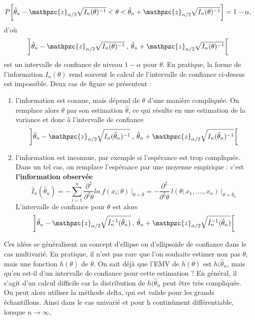 \documentclass[french]{report}
\begin{document}
\begin{equation*}
    P \bigg [\hat{\theta}_n - \mathpzc{z}_{\alpha/2}\sqrt{I_n(\theta)^{-1}} < \theta < \hat{\theta}_n + \mathpzc{z}_{\alpha/2}\sqrt{I_n(\theta)^{-1}}\bigg] = 1- \alpha,
\end{equation*}
d'où
\begin{equation*}
    \bigg ]\hat{\theta}_n - \mathpzc{z}_{\alpha/2}\sqrt{I_n(\theta)^{-1}}\:,\: \hat{\theta}_n + \mathpzc{z}_{\alpha/2}\sqrt{I_n(\theta)^{-1}}\bigg[ 
\end{equation*}
est un intervalle de confiance de niveau $1 - \alpha$ pour $\theta$.
\vskip 0.1in
En pratique, la forme de l'information $I_n(\theta)$ rend souvent le calcul de l'intervalle de confiance ci-dessus est impossible. Deux cas de figure se présentent :
\begin{enumerate}
    \item l'information est connue, mais dépend de $\theta$ d’une manière compliquée. On remplace alors $\theta$ par son estimation $\hat{\theta}$, ce qui résulte en une estimation de la variance et donc à l’intervalle de confiance
    \begin{equation*}
        \bigg ]\hat{\theta}_n - \mathpzc{z}_{\alpha/2}\sqrt{I_n(\hat{\theta}_n)^{-1}} \:,\: \hat{\theta}_n + \mathpzc{z}_{\alpha/2}\sqrt{I_n(\hat{\theta}_n)^{-1}}\bigg[ 
    \end{equation*}
    \item l'information est inconnue, par exemple si l'espérance est trop compliquée. Dans un tel cas, on remplace l'espérance par une moyenne empirique : c'est \textbf{l'information observée}
    \begin{equation*}
        \hat{I}_n(\hat{\theta}_n) = - \sum_{i=1}^{n} \frac{\partial^2}{\partial^2 \theta} ln \: f(x_i;\theta) \: \bigg |_{\theta = \hat{\theta}} = -  \frac{\partial^2}{\partial^2 \theta} \:l(\theta; x_1,....,x_n) \: \bigg |_{\theta = \hat{\theta}_n}
    \end{equation*}
    L'intervalle de confiance pour $\theta$ est alors
    \begin{equation*}
        \bigg ]\hat{\theta}_n - \mathpzc{z}_{\alpha/2}\sqrt{\hat{I}_n^{-1}(\hat{\theta}_n)} \:,\: \hat{\theta}_n + \mathpzc{z}_{\alpha/2}\sqrt{\hat{I}_n^{-1}(\hat{\theta}_n)}\bigg[ 
    \end{equation*}
\end{enumerate}
Ces idées se généralisent au concept d'ellipse ou d'ellipsoïde de confiance dans le cas multivarié.
\vskip 0.1in
En pratique, il n’est pas rare que l’on souhaite estimer non pas $\theta$, mais une fonction $h(\theta)$ de $\theta$. On sait déjà que l’EMV de $h(\theta)$ est $h(\hat{\theta}_n$, mais qu’en est-il d’un intervalle de confiance pour cette estimation ? En général, il s’agit d’un calcul difficile car la distribution de $h(\hat{\theta}_n$ peut être très compliquée. On peut alors utiliser la méthode delta, qui est valide pour les grands échantillons. Ainsi dans le cas univarié et pour h continûment différentiable, lorsque $n \rightarrow \infty$,
\end{document}
